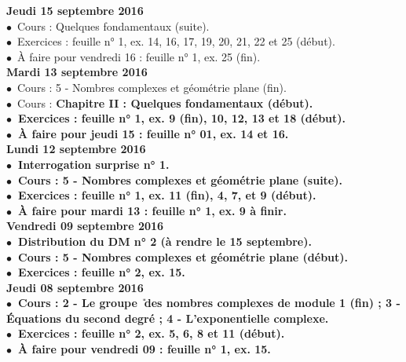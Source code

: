 \documentclass[12pt,a4paper]{article}
\begin{document}
\noindent\textbf{Jeudi 15 septembre 2016 }\\
$\bullet$\ Cours : Quelques fondamentaux (suite).\\
$\bullet$\ Exercices : feuille n° 1, ex. 14, 16, 17, 19, 20, 21, 22 et 25 (début).\\
$\bullet$\ À faire pour vendredi 16 : feuille n° 1, ex. 25 (fin).\vspace{.4cm}\\
 
\noindent\textbf{\bf Mardi 13 septembre 2016 }\\
$\bullet$\ Cours : 5 - Nombres complexes et géométrie plane (fin).\\
$\bullet$\ Cours : \bf Chapitre II \rm : Quelques fondamentaux (début).\\
$\bullet$\ Exercices : feuille n° 1, ex. 9 (fin), 10, 12, 13 et 18 (début).\\
$\bullet$\ À faire pour jeudi 15 : feuille n° 01, ex. 14 et 16.\vspace{.4cm}\\

\noindent\textbf{\bf Lundi 12 septembre 2016 }\\
$\bullet$\ Interrogation surprise n° 1.\\
$\bullet$\ Cours : 5 - Nombres complexes et géométrie plane (suite).\\
$\bullet$\ Exercices : feuille n° 1, ex. 11 (fin), 4, 7, et 9 (début).\\
$\bullet$\ À faire pour mardi 13 : feuille n° 1, ex. 9 à finir.\vspace{.4cm}\\
 
\noindent\textbf{Vendredi 09 septembre 2016 }\\
$\bullet$\ Distribution du DM n° 2 (à rendre le 15 septembre).\\
$\bullet$\ Cours : 5 - Nombres complexes et géométrie plane (début).\\
$\bullet$\ Exercices : feuille n° 2, ex. 15.\vspace{.4cm}\\

\noindent\textbf{\bf Jeudi 08 septembre 2016 }\\
$\bullet$\ Cours : 2 - Le groupe \U\ des nombres complexes de 
module 1 (fin) ; 3 - Équations du second degré ; 4 - L'exponentielle complexe.\\
$\bullet$\ Exercices : feuille n° 2, ex. 5, 6, 8 et 11 (début).\\
$\bullet$\ À faire pour vendredi 09 : feuille n° 1, ex. 15.\vspace{.4cm}\\
  
\end{document}
